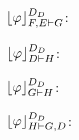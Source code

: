 \documentclass{llncs}
\begin{document}
\begin{example}
\begin{multicols}{3}
{$\projectionDDefinitional{\varphi}{F, E \seq G}$:
\begin{prooftree}
		 
	 
\end{prooftree}
}
\end{multicols}


\begin{multicols}{3}{
$\projectionDDefinitional{\varphi}{D \seq H}$:
\begin{prooftree}
 
 
 
\end{prooftree}

$\projectionDDefinitional{\varphi}{G \seq H}$:
\begin{prooftree}
 
 
 
\end{prooftree}

$\projectionDDefinitional{\varphi}{H \seq G, D}$:
\begin{prooftree}
		 
	 
\end{prooftree}
}
\end{multicols}

\end{example}
\end{document}
